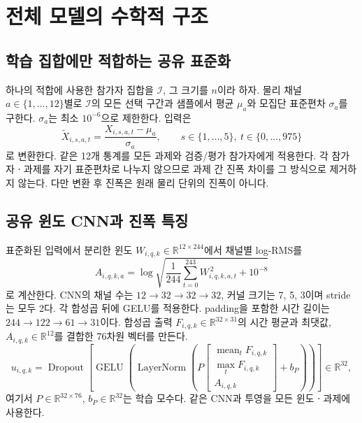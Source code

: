 \documentclass[11pt,a4paper]{article}
\newcommand{\R}{\mathbb{R}}
\DeclareMathOperator{\mean}{mean}
\DeclareMathOperator{\GELU}{GELU}
\DeclareMathOperator{\LN}{LayerNorm}
\numberwithin{equation}{section}
\begin{document}
\section{전체 모델의 수학적 구조}
\subsection{학습 집합에만 적합하는 공유 표준화}
하나의 적합에 사용한 참가자 집합을 $\mathcal I$, 그 크기를 $n$이라 하자.
물리 채널 $a\in\{1,\ldots,12\}$별로 $\mathcal I$의 모든 선택 구간과 샘플에서
평균 $\mu_a$와 모집단 표준편차 $\sigma_a$를 구한다. $\sigma_a$는 최소
$10^{-6}$으로 제한한다. 입력은
\begin{equation}
 \widetilde X_{i,s,a,t}=\frac{X_{i,s,a,t}-\mu_a}{\sigma_a},
 \qquad s\in\{1,\ldots,5\},\ t\in\{0,\ldots,975\}
\end{equation}
로 변환한다. 같은 12개 통계를 모든 과제와 검증/평가 참가자에게 적용한다.
각 참가자ㆍ과제를 자기 표준편차로 나누지 않으므로 과제 간 진폭 차이를
그 방식으로 제거하지 않는다. 다만 변환 후 진폭은 원래 물리 단위의 진폭이 아니다.

\subsection{공유 윈도 CNN과 진폭 특징}
표준화된 입력에서 분리한 윈도 $W_{i,q,k}\in\R^{12\times244}$에서 채널별 log-RMS를
\begin{equation}
 A_{i,q,k,a}=\log\sqrt{\frac1{244}\sum_{t=0}^{243}W_{i,q,k,a,t}^{\,2}+10^{-8}}
 \label{eq:rms}
\end{equation}
로 계산한다. CNN의 채널 수는 $12\to32\to32\to32$, 커널 크기는
7, 5, 3이며 stride는 모두 2다. 각 합성곱 뒤에 GELU를 적용한다.
padding을 포함한 시간 길이는 $244\to122\to61\to31$이다.
합성곱 출력 $F_{i,q,k}\in\R^{32\times31}$의 시간 평균과 최댓값,
$A_{i,q,k}\in\R^{12}$를 결합한 76차원 벡터를 만든다.
\begin{equation}
 u_{i,q,k}=\operatorname{Dropout}\!\left[\GELU\!\left(\LN\!\left(
 P\begin{bmatrix}\mean_t F_{i,q,k}\\\max_t F_{i,q,k}\\ A_{i,q,k}\end{bmatrix}+b_P
 \right)\right)\right]\in\R^{32},
\end{equation}
여기서 $P\in\R^{32\times76}$, $b_P\in\R^{32}$는 학습 모수다.
같은 CNN과 투영을 모든 윈도ㆍ과제에 사용한다.
\end{document}
